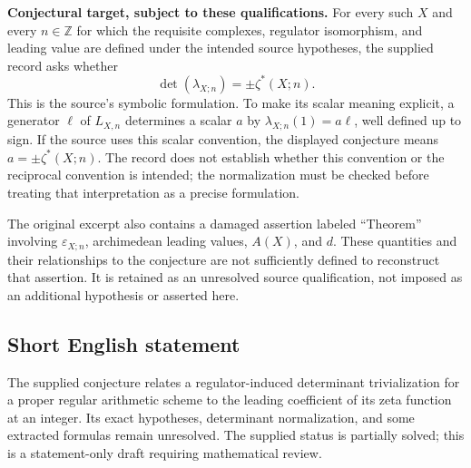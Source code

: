 \documentclass[11pt]{article}
\newcommand{\Z}{\mathbb{Z}}
\begin{document}
\textbf{Conjectural target, subject to these qualifications.} For every such \(X\) and every \(n\in\Z\) for which the requisite complexes, regulator isomorphism, and leading value are defined under the intended source hypotheses, the supplied record asks whether
\[
\det(\lambda_{X;n})=\pm\zeta^*(X;n).
\]
This is the source's symbolic formulation. To make its scalar meaning explicit, a generator \(\ell\) of \(L_{X,n}\) determines a scalar \(a\) by \(\lambda_{X;n}(1)=a\ell\), well defined up to sign. If the source uses this scalar convention, the displayed conjecture means \(a=\pm\zeta^*(X;n)\). The record does not establish whether this convention or the reciprocal convention is intended; the normalization must be checked before treating that interpretation as a precise formulation.

The original excerpt also contains a damaged assertion labeled ``Theorem'' involving \(\varepsilon_{X;n}\), archimedean leading values, \(A(X)\), and \(d\). These quantities and their relationships to the conjecture are not sufficiently defined to reconstruct that assertion. It is retained as an unresolved source qualification, not imposed as an additional hypothesis or asserted here.
\subsection{Short English statement}
The supplied conjecture relates a regulator-induced determinant trivialization for a proper regular arithmetic scheme to the leading coefficient of its zeta function at an integer. Its exact hypotheses, determinant normalization, and some extracted formulas remain unresolved. The supplied status is partially solved; this is a statement-only draft requiring mathematical review.
\end{document}
